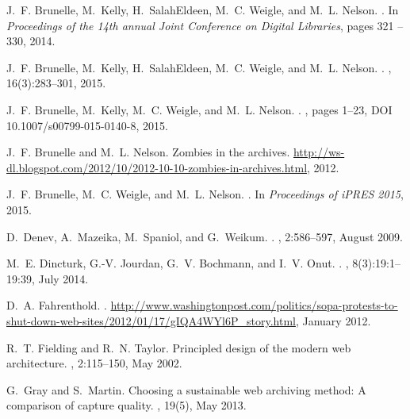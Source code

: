 \documentclass{sig-alternate}
\begin{document}
\begin{thebibliography}{10}
J.~F. Brunelle, M.~Kelly, H.~SalahEldeen, M.~C. Weigle, and M.~L. Nelson.
.
\newblock In {\em {Proceedings of the 14th annual Joint Conference on Digital
  Libraries}}, pages 321 -- 330, 2014.

J.~F. Brunelle, M.~Kelly, H.~SalahEldeen, M.~C. Weigle, and M.~L. Nelson.
.
, 16(3):283--301,
  2015.

J.~F. Brunelle, M.~Kelly, M.~C. Weigle, and M.~L. Nelson.
.
, pages 1--23, DOI 10.1007/s00799-015-0140-8, 2015.

J.~F. Brunelle and M.~L. Nelson.
\newblock Zombies in the archives.
\newblock
  \url{http://ws-dl.blogspot.com/2012/10/2012-10-10-zombies-in-archives.html},
  2012.

J.~F. Brunelle, M.~C. Weigle, and M.~L. Nelson.
.
\newblock In {\em {Proceedings of iPRES 2015}}, 2015.

D.~Denev, A.~Mazeika, M.~Spaniol, and G.~Weikum.
.
, 2:586--597, August 2009.

M.~E. Dincturk, G.-V. Jourdan, G.~V. Bochmann, and I.~V. Onut.
.
, 8(3):19:1--19:39, July 2014.

D.~A. Fahrenthold.
.
\newblock
  \url{http://www.washingtonpost.com/politics/sopa-protests-to-shut-down-web-sites/2012/01/17/gIQA4WYl6P_story.html},
  January 2012.

R.~T. Fielding and R.~N. Taylor.
\newblock Principled design of the modern web architecture.
, 2:115--150, May 2002.

G.~Gray and S.~Martin.
\newblock Choosing a sustainable web archiving method: A comparison of capture
  quality.
, 19(5), May 2013.


\end{thebibliography}
\end{document}
